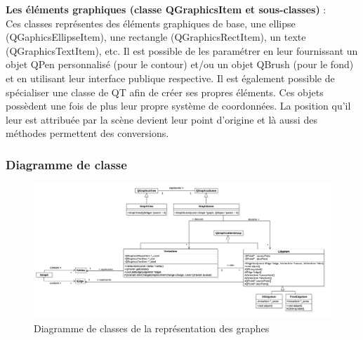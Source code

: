 \documentclass[french]{article}
\begin{document}
				\noindent \textbf{Les éléments graphiques (classe QGraphicsItem et sous-classes)} : \\
				Ces classes représentes des éléments graphiques de base, une ellipse (QGaphicsEllipseItem), une rectangle (QGraphicsRectItem), un texte (QGraphicsTextItem), etc. Il est possible de les paramétrer en leur fournissant un objet QPen personnalisé (pour le contour) et/ou un objet QBrush (pour le fond) et en utilisant leur interface publique respective. Il est également possible de spécialiser une classe de QT afin de créer ses propres éléments.
				Ces objets possèdent une fois de plus leur propre système de coordonnées. La position qu'il leur est attribuée par la scène devient leur point d'origine et là aussi des méthodes permettent des conversions.
				
				\pagebreak
				
			\subsubsection{Diagramme de classe}
				\begin{figure}[H]
					\centering
					\includegraphics[width=0.9\textheight,angle=90]{Conception/visualization/visualization.png}
					\caption{Diagramme de classes de la représentation des graphes}
				\end{figure}
				
				\pagebreak
				
\end{document}
